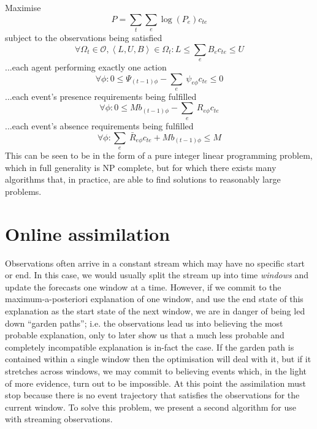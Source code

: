 \documentclass{article}
\begin{document}
Maximise
\begin{equation}
P = \sum_t\sum_e \log(P_e)c_{te}
\end{equation}
subject to the observations being satisfied
\begin{equation}
\forall \Omega_t \in \mathcal{O}, \left<L,U,B\right> \in \Omega_t: L \le \sum_e B_e c_{te} \le U
\label{observation}
\end{equation}
...each agent performing exactly one action
\begin{equation}
\forall\phi: 0 \le \Psi_{(t-1)\phi} -  \sum_e\ \psi_{e\phi} c_{te} \le 0
\label{IPagency}
\end{equation}
...each event's presence requirements being fulfilled
\begin{equation}
\forall\phi: 0 \le Mb_{(t-1)\phi} - \sum_e\ R_{e\phi} c_{te} 
\end{equation}
...each event's absence requirements being fulfilled
\begin{equation}
\forall\phi: \sum_e\ \bar{R}_{e\phi} c_{te} + Mb_{(t-1)\phi} \le M
\label{absenceConstraint}
\end{equation}
This can be seen to be in the form of a pure integer linear programming problem, which in full generality is NP complete, but for which there exists many algorithms that, in practice, are able to find solutions to reasonably large problems.


\section{Online assimilation}

Observations often arrive in a constant stream which may have no specific start or end. In this case, we would usually split the stream up into time \textit{windows} and update the forecasts one window at a time. However, if we commit to the maximum-a-posteriori explanation of one window, and use the end state of this explanation as the start state of the next window, we are in danger of being led down ``garden paths''; i.e. the observations lead us into believing the most probable explanation, only to later show us that a much less probable and completely incompatible explanation is in-fact the case. If the garden path is contained within a single window then the optimisation will deal with it, but if it stretches across windows, we may commit to believing events which, in the light of more evidence, turn out to be impossible. At this point the assimilation must stop because there is no event trajectory that satisfies the observations for the current window. To solve this problem, we present a second algorithm for use with streaming observations.
\end{document}
